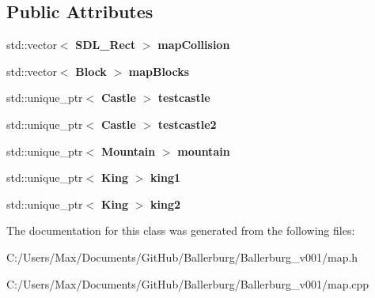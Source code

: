 \subsection*{Public Attributes}
\begin{DoxyCompactItemize}
\item 
std\+::vector$<$ {\bf S\+D\+L\+\_\+\+Rect} $>$ {\bfseries map\+Collision}\label{class_map_a6a18a7d33100d4518791d1c5b0841b98}

\item 
std\+::vector$<$ {\bf Block} $>$ {\bfseries map\+Blocks}\label{class_map_a53c68143f9c94eaea2832174925db2ac}

\item 
std\+::unique\+\_\+ptr$<$ {\bf Castle} $>$ {\bfseries testcastle}\label{class_map_a3c781a3358eb0ccde6c8b407786f81f3}

\item 
std\+::unique\+\_\+ptr$<$ {\bf Castle} $>$ {\bfseries testcastle2}\label{class_map_afb6ecf3a1491a5979cb3d8c2ddfc6289}

\item 
std\+::unique\+\_\+ptr$<$ {\bf Mountain} $>$ {\bfseries mountain}\label{class_map_a10538172aeace3ebbbcff50bfb9d5132}

\item 
std\+::unique\+\_\+ptr$<$ {\bf King} $>$ {\bfseries king1}\label{class_map_a42cfc420f9e8066d6cb894d1c5efb225}

\item 
std\+::unique\+\_\+ptr$<$ {\bf King} $>$ {\bfseries king2}\label{class_map_ab0c064cac3fb14f96e7ae7b75c961e7d}

\end{DoxyCompactItemize}


The documentation for this class was generated from the following files\+:\begin{DoxyCompactItemize}
\item 
C\+:/\+Users/\+Max/\+Documents/\+Git\+Hub/\+Ballerburg/\+Ballerburg\+\_\+v001/map.\+h\item 
C\+:/\+Users/\+Max/\+Documents/\+Git\+Hub/\+Ballerburg/\+Ballerburg\+\_\+v001/map.\+cpp\end{DoxyCompactItemize}
